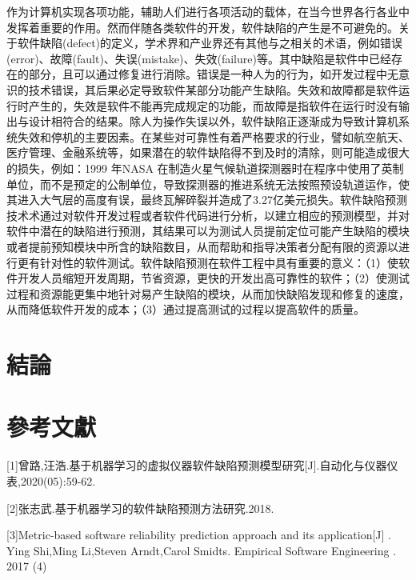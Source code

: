 \documentclass[12pt, a4paper]{article}
\begin{document}
作为计算机实现各项功能，辅助人们进行各项活动的载体，在当今世界各行各业中发挥着重要的作用。然而伴随各类软件的开发，软件缺陷的产生是不可避免的。关于软件缺陷(defect)的定义，学术界和产业界还有其他与之相关的术语，例如错误(error)、故障(fault)、失误(mistake)、失效(failure)等。其中缺陷是软件中已经存在的部分，且可以通过修复进行消除。错误是一种人为的行为，如开发过程中无意识的技术错误，其后果必定导致软件某部分功能产生缺陷。失效和故障都是软件运行时产生的，失效是软件不能再完成规定的功能，而故障是指软件在运行时没有输出与设计相符合的结果。除人为操作失误以外，软件缺陷正逐渐成为导致计算机系统失效和停机的主要因素。在某些对可靠性有着严格要求的行业，譬如航空航天、医疗管理、金融系统等，如果潜在的软件缺陷得不到及时的清除，则可能造成很大的损失，例如：1999 年NASA 在制造火星气候轨道探测器时在程序中使用了英制单位，而不是预定的公制单位，导致探测器的推进系统无法按照预设轨道运作，使其进入大气层的高度有误，最终瓦解碎裂并造成了3.27亿美元损失。软件缺陷预测技术术通过对软件开发过程或者软件代码进行分析，以建立相应的预测模型，并对软件中潜在的缺陷进行预测，其结果可以为测试人员提前定位可能产生缺陷的模块或者提前预知模块中所含的缺陷数目，从而帮助和指导决策者分配有限的资源以进行更有针对性的软件测试。软件缺陷预测在软件工程中具有重要的意义：（1）使软件开发人员缩短开发周期，节省资源，更快的开发出高可靠性的软件；（2）使测试过程和资源能更集中地针对易产生缺陷的模块，从而加快缺陷发现和修复的速度，从而降低软件开发的成本；（3）通过提高测试的过程以提高软件的质量。

\section{結論}

\section{參考文獻}

[1]曾路,汪浩.基于机器学习的虚拟仪器软件缺陷预测模型研究[J].自动化与仪器仪表,2020(05):59-62.

[2]张志武.基于机器学习的软件缺陷预测方法研究.2018.

[3]Metric-based software reliability prediction approach and its application[J] . Ying Shi,Ming Li,Steven Arndt,Carol Smidts.  Empirical Software Engineering . 2017 (4) 
\end{document}
